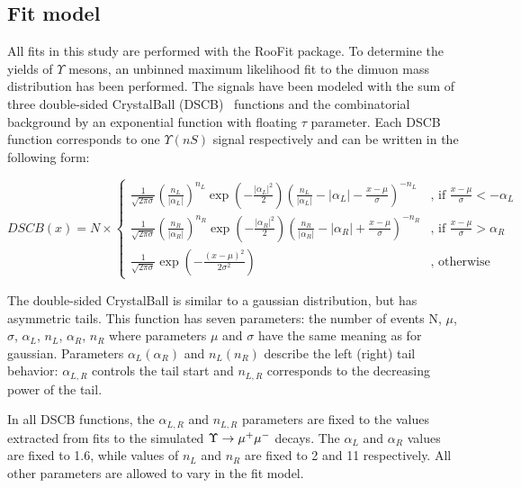 \subsection{Fit model}
\label{sec:upsilon:fit}
All  fits in this study are performed with the RooFit package\cite{roofit}.
To determine the yields of $\Upsilon$ mesons, an unbinned maximum likelihood
fit to the dimuon mass distribution has been performed. The signals have been
modeled with the sum of three double-sided CrystalBall (DSCB)~\cite{Skwarnicki:1986xj} functions and the
combinatorial background by an exponential function with floating $\tau$
parameter. Each DSCB function corresponds to one $\Upsilon(nS)$ signal respectively
and can be written in the following form:

\begin{equation}
DSCB(x) = N \times
\begin{cases}
\frac{1}{\sqrt{2\pi\sigma}}{(\frac{n_L}{|\alpha_L|})}^{n_L}\exp(-\frac{|\alpha_L|^2}{2}){(\frac{n_L}{|\alpha_L|}-|\alpha_L|-\frac{x-\mu}{\sigma})}^{-n_L} & \text{, if $\frac{x-\mu}{\sigma} < -\alpha_L$}\\
\frac{1}{\sqrt{2\pi\sigma}}{(\frac{n_R}{|\alpha_R|})}^{n_R}\exp(-\frac{|\alpha_R|^2}{2}){(\frac{n_R}{|\alpha_R|}-|\alpha_R|+\frac{x-\mu}{\sigma})}^{-n_R} & \text{, if $\frac{x-\mu}{\sigma} > \alpha_R$}\\
\frac{1}{\sqrt{2\pi\sigma}}\exp(-\frac{{(x-\mu)}^2}{2\sigma^2}) & \text{, otherwise}
\end{cases}
\label{eq:dcb}
\end{equation}

The double-sided CrystalBall is similar to a gaussian
distribution, but has asymmetric tails. This function has seven parameters:
the number of events N, $\mu$, $\sigma$, $\alpha_L$, $n_L$, $\alpha_R$, $n_R$ where parameters $\mu$
and $\sigma$ have the same meaning as for gaussian. Parameters $\alpha_L
(\alpha_R)$ and $n_L (n_R)$ describe the left (right) tail behavior:
$\alpha_{L,R}$ controls the tail start and $n_{L,R}$ corresponds to the
decreasing power of the tail. 

In all DSCB functions, the  $\alpha_{L,R}$ and $n_{L,R}$ parameters are fixed to the values extracted
from fits to the simulated $\Upsilon \rightarrow \mu^+\mu^-$ decays. The $\alpha_L$ and
$\alpha_R$ values are fixed to 1.6, while values of $n_L$  and $n_R$ are fixed
to 2 and 11 respectively. All other parameters are allowed to vary in the fit model.

